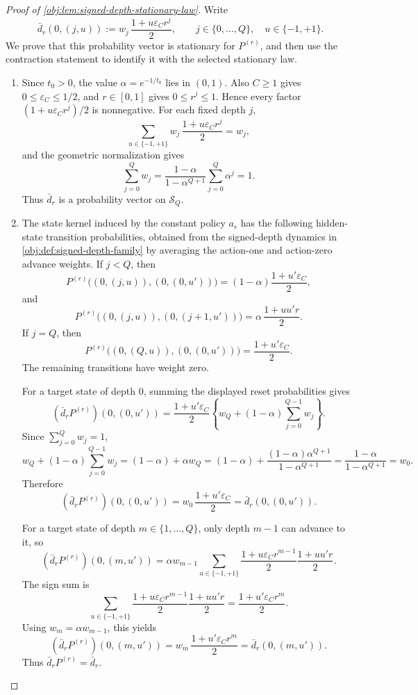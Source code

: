 \begin{proof}[Proof of \cref{obj:lem:signed-depth-stationary-law}]
Write
\[
\bar d_r(0,(j,u))
:=
w_j\,\frac{1+u\varepsilon_C r^j}{2},
\qquad
j\in\{0,\ldots,Q\},\quad u\in\{-1,+1\}.
\]
We prove that this probability vector is stationary for \(P^{(r)}\), and then use the
contraction statement to identify it with the selected stationary law.

\begin{enumerate}
\item Since \(t_0>0\), the value \(\alpha=e^{-1/t_0}\) lies in \((0,1)\). Also
\(C\ge 1\) gives \(0\le \varepsilon_C\le 1/2\), and \(r\in[0,1]\) gives
\(0\le r^j\le 1\). Hence every factor
\((1+u\varepsilon_C r^j)/2\) is nonnegative. For each fixed depth \(j\),
\[
\sum_{u\in\{-1,+1\}}
w_j\,\frac{1+u\varepsilon_C r^j}{2}
=w_j,
\]
and the geometric normalization gives
\[
\sum_{j=0}^Q w_j
=
\frac{1-\alpha}{1-\alpha^{Q+1}}\sum_{j=0}^Q \alpha^j
=1.
\]
Thus \(\bar d_r\) is a probability vector on \(\mathcal S_Q\). %

\item The state kernel induced by the constant policy \(a_r\) has the following
hidden-state transition probabilities, obtained from the signed-depth dynamics in
\cref{obj:def:signed-depth-family} by averaging the action-one and action-zero
advance weights. If \(j<Q\), then
\[
P^{(r)}\bigl((0,(j,u)),(0,(0,u'))\bigr)
=(1-\alpha)\frac{1+u'\varepsilon_C}{2},
\]
and
\[
P^{(r)}\bigl((0,(j,u)),(0,(j+1,u'))\bigr)
=
\alpha\,\frac{1+uu'r}{2}.
\]
If \(j=Q\), then
\[
P^{(r)}\bigl((0,(Q,u)),(0,(0,u'))\bigr)
=
\frac{1+u'\varepsilon_C}{2}.
\]
The remaining transitions have weight zero. %

For a target state of depth \(0\), summing the displayed reset probabilities gives
\[
(\bar d_rP^{(r)})(0,(0,u'))
=
\frac{1+u'\varepsilon_C}{2}
\left\{
w_Q+(1-\alpha)\sum_{j=0}^{Q-1}w_j
\right\}.
\]
Since \(\sum_{j=0}^Q w_j=1\),
\[
w_Q+(1-\alpha)\sum_{j=0}^{Q-1}w_j
=
(1-\alpha)+\alpha w_Q
=
(1-\alpha)+
\frac{(1-\alpha)\alpha^{Q+1}}{1-\alpha^{Q+1}}
=
\frac{1-\alpha}{1-\alpha^{Q+1}}
=w_0.
\]
Therefore
\[
(\bar d_rP^{(r)})(0,(0,u'))
=
w_0\,\frac{1+u'\varepsilon_C}{2}
=
\bar d_r(0,(0,u')).
\]

For a target state of depth \(m\in\{1,\ldots,Q\}\), only depth \(m-1\) can advance
to it, so
\[
(\bar d_rP^{(r)})(0,(m,u'))
=
\alpha w_{m-1}
\sum_{u\in\{-1,+1\}}
\frac{1+u\varepsilon_C r^{m-1}}{2}
\frac{1+uu'r}{2}.
\]
The sign sum is
\[
\sum_{u\in\{-1,+1\}}
\frac{1+u\varepsilon_C r^{m-1}}{2}
\frac{1+uu'r}{2}
=
\frac{1+u'\varepsilon_C r^m}{2}.
\]
Using \(w_m=\alpha w_{m-1}\), this yields
\[
(\bar d_rP^{(r)})(0,(m,u'))
=
w_m\,\frac{1+u'\varepsilon_C r^m}{2}
=
\bar d_r(0,(m,u')).
\]
Thus \(\bar d_rP^{(r)}=\bar d_r\). %


\end{enumerate}
\end{proof}
